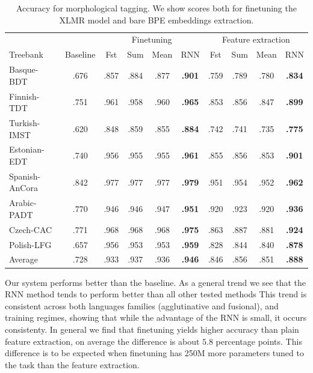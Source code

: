 \documentclass[11pt]{article}
\begin{document}
    \begin{table}%
	\centering
	\begin{tabular}{l|c|cccc|cccc}
		& & \multicolumn{4}{c}{Finetuning} & \multicolumn{4}{c}{Feature extraction} \\
		Treebank & Baseline & Fst & Sum & Mean & RNN & Fst & Sum & Mean & RNN \\
		\hline
		Basque-BDT      & .676 & .857 & .884 & .877 & \textbf{.901} & .759 & .789 & .780 & \textbf{.834} \\
		Finnish-TDT     & .751 & .961 & .958 & .960 & \textbf{.965} & .853 & .856 & .847 & \textbf{.899} \\
		Turkish-IMST    & .620 & .848 & .859 & .855 & \textbf{.884} & .742 & .741 & .735 & \textbf{.775} \\
		Estonian-EDT    & .740 & .956 & .955 & .955 & \textbf{.961} & .855 & .856 & .853 & \textbf{.901} \\
		Spanish-AnCora  & .842 & .977 & .977 & .977 & \textbf{.979} & .951 & .954 & .952 & \textbf{.962} \\
		Arabic-PADT     & .770 & .946 & .946 & .947 & \textbf{.951} & .920 & .923 & .920 & \textbf{.936} \\
		Czech-CAC       & .771 & .968 & .968 & .968 & \textbf{.975} & .863 & .887 & .881 & \textbf{.924} \\
		Polish-LFG      & .657 & .956 & .953 & .953 & \textbf{.959} & .828 & .844 & .840 & \textbf{.878} \\
        \hline
        Average         & .728 & .933 & .937 & .936 & \textbf{.946} & .846 & .856 & .851 & \textbf{.888} \\
	\end{tabular}
    	\caption{\label{tab:results_tokens} Accuracy for morphological
          tagging. We show scores both for finetuning the XLMR model and
          bare BPE embeddings extraction.}
    \end{table}


                Our system performs better than the baseline. As a
     general trend we see that the RNN method tends to perform better
     than all other tested methods This trend is consistent across
     both languages families (agglutinative and fusional), and
     training regimes, showing that while the advantage of the RNN is
     small, it occurs consistenty.
        In general we find that finetuning yields higher accuracy than
        plain feature extraction, on average the difference is about $5.8$
        percentage points.  This difference is to be expected when
        finetuning has 250M more parameters tuned to the task than the
        feature extraction. %
    
\end{document}
